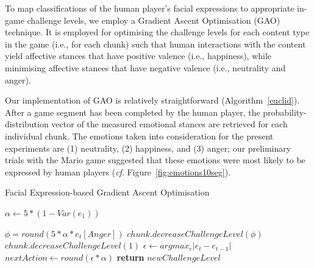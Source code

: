 \documentclass[letterpaper]{article}
\begin{document}
To map classifications of the human player's facial expressions to appropriate in-game challenge levels, we employ a Gradient Ascent Optimisation (GAO) technique. It is employed for optimising the challenge levels for each content type in the game (i.e., for each chunk) such that human interactions with the content yield affective stances that have positive valence (i.e., happiness), while minimising affective stances that have negative valence (i.e., neutrality and anger).

Our implementation of GAO is relatively straightforward (Algorithm~\ref{euclid}). After a game segment has been completed by the human player, the probability-distribution vector of the measured emotional stances are retrieved for each individual chunk. The emotions taken into consideration for the present experiments are (1) neutrality, (2) happiness, and (3) anger; our preliminary trials with the Mario game suggested that these emotions were most likely to be expressed by human players (\emph{cf}. Figure~\ref{fig:emotions10seg}).

\begin{algorithm}[t]
\tiny
\caption{Facial Expression-based Gradient Ascent Optimisation}
\label{euclid}
\begin{algorithmic}[1]

   \State $\alpha\gets 5*(1-Var(e_1))$

\State $\phi = round(5*\alpha * e_t[Anger])$
\State $chunk.decreaseChallengeLevel(\phi)$
	\State $chunk.decreaseChallengeLevel(1)$
\Else
      \State $\epsilon\gets argmax_e|e_t-e_{t-1}|$ 
      \State $nextAction\gets round(\epsilon*\alpha)$
      \EndIf
      \State \textbf{return} $newChallengeLevel$
      \EndIf

      \EndIf
   \EndFor
\EndProcedure
\end{algorithmic}
\end{algorithm}
\end{document}
